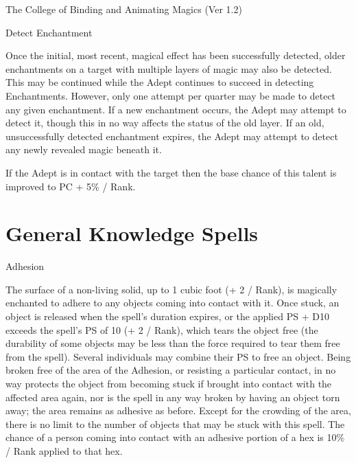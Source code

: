 \begin{Chapter}{The College of Binding and Animating Magics (Ver 1.2)}
\begin{talent}[T-2]{Detect Enchantment}
\begin{effects}
Once the initial, most recent, magical effect has been successfully
detected, older enchantments on a target with multiple layers of magic
may also be detected.  This may be continued while the Adept continues
to succeed in detecting Enchantments.  However, only one attempt per
quarter may be made to detect any given enchantment.  If a new
enchantment occurs, the Adept may attempt to detect it, though this in
no way affects the status of the old layer.  If an old, unsuccessfully
detected enchantment expires, the Adept may attempt to detect any
newly revealed magic beneath it.

If the Adept is in contact with the target then the base chance of
this talent is improved to PC + 5\% / Rank.
\end{effects}
\end{talent}

\section{General Knowledge Spells}

\begin{spell}[G-1]{Adhesion }

\begin{effects}
The surface of a non-living solid, up to 1 cubic foot (+ 2 / Rank), is
magically enchanted to adhere to any objects coming into contact with
it.  Once stuck, an object is released when the spell’s duration
expires, or the applied PS + D10 exceeds the spell’s PS of 10 (+ 2 /
Rank), which tears the object free (the durability of some objects may
be less than the force required to tear them free from the spell).
Several individuals may combine their PS to free an object. Being
broken free of the area of the Adhesion, or resisting a particular
contact, in no way protects the object from becoming stuck if brought
into contact with the affected area again, nor is the spell in any way
broken by having an object torn away; the area remains as adhesive as
before. Except for the crowding of the area, there is no limit to the
number of objects that may be stuck with this spell. The chance of a
person coming into contact with an adhesive portion of a hex is 10\% /
Rank applied to that hex.
\end{effects}
\end{spell}


\end{Chapter}
